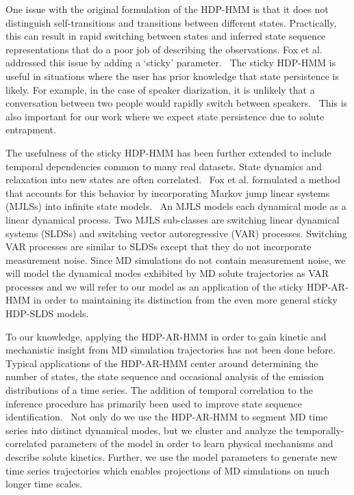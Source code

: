 \documentclass[journal=jpcbfk,manuscript=article]{achemso}
\begin{document}
  One issue with the original formulation of the HDP-HMM is that it does 
  not distinguish self-transitions and transitions between different states.
  Practically, this can result in rapid switching between states and inferred
  state sequence representations that do a poor job of describing the 
  observations. Fox et al. addressed this issue by adding a `sticky' 
  parameter.~\cite{fox_sticky_2007} The sticky HDP-HMM is useful in situations
  where the user has prior knowledge that state persistence is likely.
  For example, in the case of speaker diarization, it is unlikely that a 
  conversation between two people would rapidly switch between speakers.~\cite{fox_sticky_2011}
  This is also important for our work where we expect state persistence due
  to solute entrapment.   
  
  The usefulness of the sticky HDP-HMM has been further extended to include 
  temporal dependencies common to many real datasets. State dynamics and 
  relaxation into new states are often correlated.~\cite{calderon_data-driven_2014}
  Fox et al. formulated a method that accounts for this behavior by
  incorporating Markov jump linear systems (MJLSs) into infinite state 
  models.~\cite{fox_nonparametric_2009} An MJLS models each dynamical mode
  as a linear dynamical process. Two MJLS sub-classes are switching linear
  dynamical systems (SLDSs) and switching vector autoregressive (VAR) processes.
  Switching VAR processes are similar to SLDSs except that they do not
  incorporate measurement noise. Since MD simulations do not contain measurement
  noise, we will model the dynamical modes exhibited by MD solute trajectories 
  as VAR processes and we will refer to our model as an application of the 
  sticky HDP-AR-HMM in order to maintaining its distinction from the even more
  general sticky HDP-SLDS models.
  
  To our knowledge, applying the HDP-AR-HMM in order to gain kinetic and
  mechanistic insight from MD simulation trajectories has not been done
  before.
  Typical applications of the HDP-AR-HMM center around determining the 
  number of states, the state sequence and occasional analysis of the emission 
  distributions of a time series. The addition of temporal correlation to 
  the inference procedure has primarily been used to improve state sequence 
  identification.~\cite{calderon_inferring_2015,hamada_modeling_2016}
  Not only do we use the HDP-AR-HMM to segment MD time series into distinct
  dynamical modes, but we cluster and analyze the temporally-correlated 
  parameters of the model in order to learn physical mechanisms and describe
  solute kinetics. Further, we use the model parameters to generate new 
  time series trajectories which enables projections of MD simulations on 
  much longer time scales.
  
\end{document}
